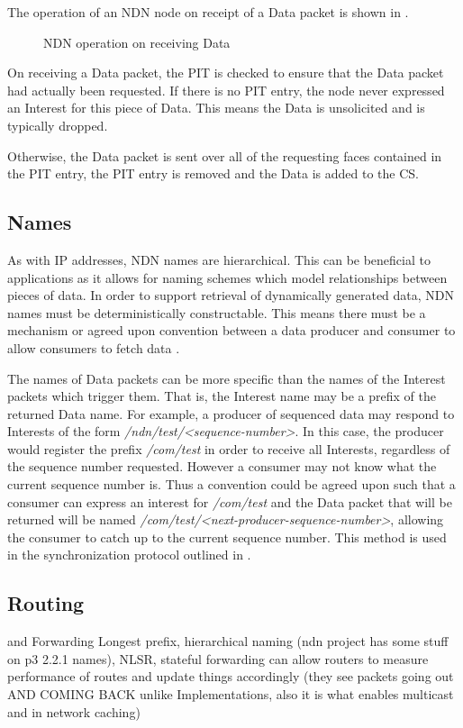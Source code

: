 The operation of an NDN node on receipt of a Data packet is shown in .
\begin{figure}[H]
    \centering
    \caption{NDN operation on receiving Data}
    \label{fig:ndn-on-data}
\end{figure}


On receiving a Data packet, the PIT is checked to ensure that the Data packet had actually been requested. If there is no PIT entry, the node never expressed an Interest for this piece of Data. This means the Data is unsolicited and is typically dropped.

Otherwise, the Data packet is sent over all of the requesting faces contained in the PIT entry, the PIT entry is removed and the Data is added to the CS.


\subsection{Names}\label{sec:ndn-names}
As with IP addresses, NDN names are hierarchical. This can be beneficial to applications as it allows for naming schemes which model relationships between pieces of data. In order to support retrieval of dynamically generated data, NDN names must be deterministically constructable. This means there must be a mechanism or agreed upon convention between a data producer and consumer to allow consumers to fetch data \cite{ndn-project}. 

The names of Data packets can be more specific than the names of the Interest packets which trigger them. That is, the Interest name may be a prefix of the returned Data name. For example, a producer of sequenced data may respond to Interests of the form \textit{/ndn/test/<sequence-number>}.  In this case, the producer would register the prefix \textit{/com/test} in order to receive all Interests, regardless of the sequence number requested. However a consumer may not know what the current sequence number is. Thus a convention could be agreed upon such that a consumer can express an interest for \textit{/com/test} and the Data packet that will be returned will be named \textit{/com/test/<next-producer-sequence-number>}, allowing the consumer to catch up to the current sequence number. This method is used in the synchronization protocol outlined in .

\subsection{Routing} and Forwarding\label{sec:routing}
Longest prefix, hierarchical naming (ndn project has some stuff on p3 2.2.1 names), NLSR, stateful forwarding can allow routers to measure performance of routes and update things accordingly (they see packets going out AND COMING BACK unlike Implementations, also it is what enables multicast and in network caching)

